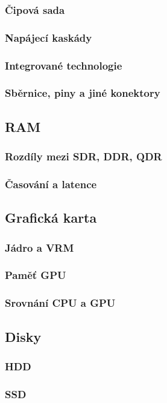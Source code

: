 \documentclass[a4paper]{article}
\begin{document}
        \subsubsection{Čipová sada}
        \subsubsection{Napájecí kaskády}
        \subsubsection{Integrované technologie}
        \subsubsection{Sběrnice, piny a jiné konektory}
    \subsection{RAM}
        \subsubsection{Rozdíly mezi SDR, DDR, QDR}
        \subsubsection{Časování a latence}
    \subsection{Grafická karta}
        \subsubsection{Jádro a VRM}
        \subsubsection{Paměť GPU}
        \subsubsection{Srovnání CPU a GPU}
    \subsection{Disky}
        \subsubsection{HDD}
        \subsubsection{SSD}
\end{document}
